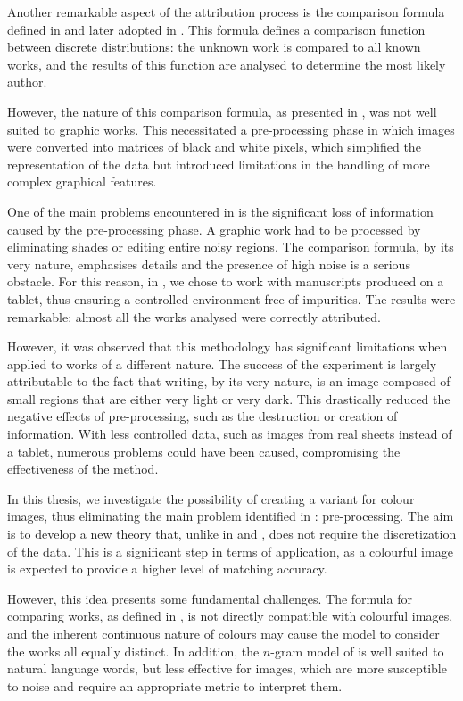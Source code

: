 \begin{toReview}
		\noindent Another remarkable aspect of the attribution process is the comparison formula defined in \cite{SapAttribution} and later adopted in \cite{thesis}. This formula defines a comparison function between discrete distributions: the unknown work is compared to all known works, and the results of this function are analysed to determine the most likely author.

		\noindent However, the nature of this comparison formula, as presented in \cite{thesis}, was not well suited to graphic works. This necessitated a pre-processing phase in which images were converted into matrices of black and white pixels, which simplified the representation of the data but introduced limitations in the handling of more complex graphical features.

		\bigskip \noindent One of the main problems encountered in \cite{thesis} is the significant loss of information caused by the pre-processing phase. A graphic work had to be processed by eliminating shades or editing entire noisy regions. The comparison formula, by its very nature, emphasises details and the presence of high noise is a serious obstacle. For this reason, in \cite{thesis}, we chose to work with manuscripts produced on a tablet, thus ensuring a controlled environment free of impurities. The results were remarkable: almost all the works analysed were correctly attributed.

		\noindent However, it was observed that this methodology has significant limitations when applied to works of a different nature. The success of the experiment is largely attributable to the fact that writing, by its very nature, is an image composed of small regions that are either very light or very dark. This drastically reduced the negative effects of pre-processing, such as the destruction or creation of information. With less controlled data, such as images from real sheets instead of a tablet, numerous problems could have been caused, compromising the effectiveness of the method.

		\bigskip \noindent In this thesis, we investigate the possibility of creating a variant for colour images, thus eliminating the main problem identified in \cite{thesis}: pre-processing. The aim is to develop a new theory that, unlike in \cite{thesis} and \cite{SapAttribution}, does not require the discretization of the data. This is a significant step in terms of application, as a colourful image is expected to provide a higher level of matching accuracy.

		\noindent However, this idea presents some fundamental challenges. The formula for comparing works, as defined in \cite{SapAttribution}, is not directly compatible with colourful images, and the inherent continuous nature of colours may cause the model to consider the works all equally distinct. In addition, the $n$-gram model of \citeauthor{Shannon_ngrammodel} is well suited to natural language words, but less effective for images, which are more susceptible to noise and require an appropriate metric to interpret them.


\end{toReview}
